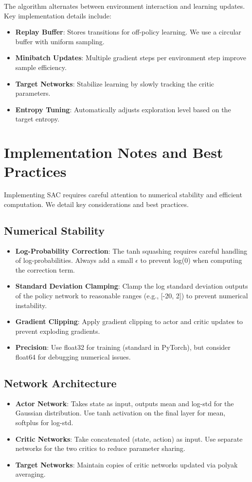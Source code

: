 \documentclass[conference]{IEEEtran}
\begin{document}
The algorithm alternates between environment interaction and learning updates. Key implementation details include:
\begin{itemize}
  \item \textbf{Replay Buffer}: Stores transitions for off-policy learning. We use a circular buffer with uniform sampling.
  \item \textbf{Minibatch Updates}: Multiple gradient steps per environment step improve sample efficiency.
  \item \textbf{Target Networks}: Stabilize learning by slowly tracking the critic parameters.
  \item \textbf{Entropy Tuning}: Automatically adjusts exploration level based on the target entropy.
\end{itemize}

\section{Implementation Notes and Best Practices}
Implementing SAC requires careful attention to numerical stability and efficient computation. We detail key considerations and best practices.

\subsection{Numerical Stability}
\begin{itemize}
  \item \textbf{Log-Probability Correction}: The tanh squashing requires careful handling of log-probabilities. Always add a small $\epsilon$ to prevent log(0) when computing the correction term.
  \item \textbf{Standard Deviation Clamping}: Clamp the log standard deviation outputs of the policy network to reasonable ranges (e.g., [-20, 2]) to prevent numerical instability.
  \item \textbf{Gradient Clipping}: Apply gradient clipping to actor and critic updates to prevent exploding gradients.
  \item \textbf{Precision}: Use float32 for training (standard in PyTorch), but consider float64 for debugging numerical issues.
\end{itemize}

\subsection{Network Architecture}
\begin{itemize}
  \item \textbf{Actor Network}: Takes state as input, outputs mean and log-std for the Gaussian distribution. Use tanh activation on the final layer for mean, softplus for log-std.
  \item \textbf{Critic Networks}: Take concatenated (state, action) as input. Use separate networks for the two critics to reduce parameter sharing.
  \item \textbf{Target Networks}: Maintain copies of critic networks updated via polyak averaging.
\end{itemize}
\end{document}
